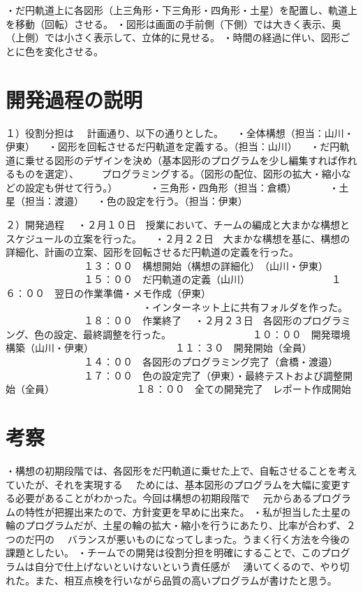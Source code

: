 \documentclass[12pt,a4j]{jarticle}
\begin{document}
・だ円軌道上に各図形（上三角形・下三角形・四角形・土星）を配置し、軌道上を移動（回転）させる。
・図形は画面の手前側（下側）では大きく表示、奥（上側）では小さく表示して、立体的に見せる。
・時間の経過に伴い、図形ごとに色を変化させる。

\section{開発過程の説明}

１）役割分担は
　計画通り、以下の通りとした。
　・全体構想（担当：山川・伊東）
　・図形を回転させるだ円軌道を定義する。（担当：山川）
　・だ円軌道に乗せる図形のデザインを決め（基本図形のプログラムを少し編集すれば作れるものを選定）、
　　プログラミングする。（図形の配位、図形の拡大・縮小などの設定も併せて行う。）
　　　・三角形・四角形（担当：倉橋）
　　　・土星（担当：渡邉）
　・色の設定を行う。（担当：伊東）

２）開発過程
　・２月１０日　授業において、チームの編成と大まかな構想とスケジュールの立案を行った。
　・２月２２日　大まかな構想を基に、構想の詳細化、計画の立案、図形を回転させるだ円軌道の定義を行った。
　　　　　　　　１３：００　構想開始（構想の詳細化）　（山川・伊東）
　　　　　　　　１５：００　だ円軌道の定義（山川）
　　　　　　　　１６：００　翌日の作業準備・メモ作成（伊東）
　　　　　　　　　　　　　　・インターネット上に共有フォルダを作った。
　　　　　　　　１８：００　作業終了
　・２月２３日　各図形のプログラミング、色の設定、最終調整を行った。
　　　　　　　　１０：００　開発環境構築（山川・伊東）
　　　　　　　　１１：３０　開発開始（全員）
　　　　　　　　１４：００　各図形のプログラミング完了（倉橋・渡邉）
　　　　　　　　１７：００　色の設定完了（伊東）・最終テストおよび調整開始（全員）
　　　　　　　　１８：００　全ての開発完了　レポート作成開始

\section{考察}

・構想の初期段階では、各図形をだ円軌道に乗せた上で、自転させることを考えていたが、それを実現する
　ためには、基本図形のプログラムを大幅に変更する必要があることがわかった。今回は構想の初期段階で
　元からあるプログラムの特性が把握出来たので、方針変更を早めに出来た。
・私が担当した土星の輪のプログラムだが、土星の輪の拡大・縮小を行うにあたり、比率が合わず、２つのだ円の
　バランスが悪いものになってしまった。うまく行く方法を今後の課題としたい。
・チームでの開発は役割分担を明確にすることで、このプログラムは自分で仕上げないといけないという責任感が
　湧いてくるので、やり切れた。また、相互点検を行いながら品質の高いプログラムが書けたと思う。
\end{document}
